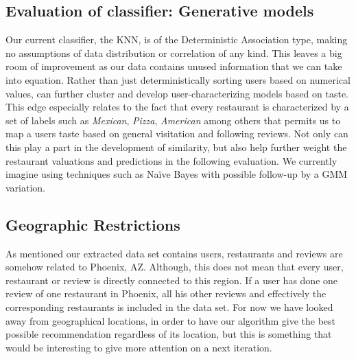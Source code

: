 \documentclass[10pt,twocolumn,letterpaper]{article}
\begin{document}
\subsection{Evaluation of classifier: Generative models}
Our current classifier, the KNN, is of the Deterministic Association type, making no assumptions of data distribution or correlation of any kind. This leaves a big room of improvement as our data contains unused information that we can take into equation. Rather than just deterministically sorting users based on numerical values, can further cluster and develop user-characterizing models based on taste. This edge especially relates to the fact that every restaurant is characterized by a set of labels such as \textit{Mexican}, \textit{Pizza}, \textit{American} among others that permits us to map a users taste based on general visitation and following reviews. Not only can this play a part in the development of similarity, but also help further weight the restaurant valuations and predictions in the following evaluation. We currently imagine using techniques such as Naïve Bayes with possible follow-up by a GMM variation.

\subsection{Geographic Restrictions}
As mentioned our extracted data set contains users, restaurants and reviews are somehow related to Phoenix, AZ. Although, this does not mean that every user, restaurant or review is directly connected to this region. If a user has done one review of one restaurant in Phoenix, all his other reviews and effectively the corresponding restaurants is included in the data set. For now we have looked away from geographical locations, in order to have our algorithm give the best possible recommendation regardless of its location, but this is something that would be interesting to give more attention on a next iteration.

{\small

}
\end{document}
